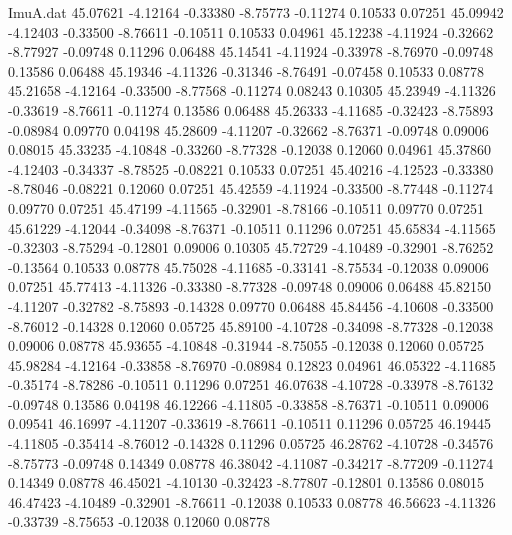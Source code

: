 \begin{filecontents}{ImuA.dat}
  45.07621   -4.12164   -0.33380   -8.75773   -0.11274    0.10533    0.07251
  45.09942   -4.12403   -0.33500   -8.76611   -0.10511    0.10533    0.04961
  45.12238   -4.11924   -0.32662   -8.77927   -0.09748    0.11296    0.06488
  45.14541   -4.11924   -0.33978   -8.76970   -0.09748    0.13586    0.06488
  45.19346   -4.11326   -0.31346   -8.76491   -0.07458    0.10533    0.08778
  45.21658   -4.12164   -0.33500   -8.77568   -0.11274    0.08243    0.10305
  45.23949   -4.11326   -0.33619   -8.76611   -0.11274    0.13586    0.06488
  45.26333   -4.11685   -0.32423   -8.75893   -0.08984    0.09770    0.04198
  45.28609   -4.11207   -0.32662   -8.76371   -0.09748    0.09006    0.08015
  45.33235   -4.10848   -0.33260   -8.77328   -0.12038    0.12060    0.04961
  45.37860   -4.12403   -0.34337   -8.78525   -0.08221    0.10533    0.07251
  45.40216   -4.12523   -0.33380   -8.78046   -0.08221    0.12060    0.07251
  45.42559   -4.11924   -0.33500   -8.77448   -0.11274    0.09770    0.07251
  45.47199   -4.11565   -0.32901   -8.78166   -0.10511    0.09770    0.07251
  45.61229   -4.12044   -0.34098   -8.76371   -0.10511    0.11296    0.07251
  45.65834   -4.11565   -0.32303   -8.75294   -0.12801    0.09006    0.10305
  45.72729   -4.10489   -0.32901   -8.76252   -0.13564    0.10533    0.08778
  45.75028   -4.11685   -0.33141   -8.75534   -0.12038    0.09006    0.07251
  45.77413   -4.11326   -0.33380   -8.77328   -0.09748    0.09006    0.06488
  45.82150   -4.11207   -0.32782   -8.75893   -0.14328    0.09770    0.06488
  45.84456   -4.10608   -0.33500   -8.76012   -0.14328    0.12060    0.05725
  45.89100   -4.10728   -0.34098   -8.77328   -0.12038    0.09006    0.08778
  45.93655   -4.10848   -0.31944   -8.75055   -0.12038    0.12060    0.05725
  45.98284   -4.12164   -0.33858   -8.76970   -0.08984    0.12823    0.04961
  46.05322   -4.11685   -0.35174   -8.78286   -0.10511    0.11296    0.07251
  46.07638   -4.10728   -0.33978   -8.76132   -0.09748    0.13586    0.04198
  46.12266   -4.11805   -0.33858   -8.76371   -0.10511    0.09006    0.09541
  46.16997   -4.11207   -0.33619   -8.76611   -0.10511    0.11296    0.05725
  46.19445   -4.11805   -0.35414   -8.76012   -0.14328    0.11296    0.05725
  46.28762   -4.10728   -0.34576   -8.75773   -0.09748    0.14349    0.08778
  46.38042   -4.11087   -0.34217   -8.77209   -0.11274    0.14349    0.08778
  46.45021   -4.10130   -0.32423   -8.77807   -0.12801    0.13586    0.08015
  46.47423   -4.10489   -0.32901   -8.76611   -0.12038    0.10533    0.08778
  46.56623   -4.11326   -0.33739   -8.75653   -0.12038    0.12060    0.08778

\end{filecontents}
